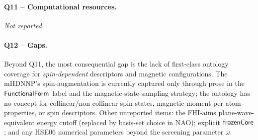\paragraph{Q11 -- Computational resources.}
\emph{Not reported.}


\paragraph{Q12 -- Gaps.}
Beyond Q11, the most consequential gap is the lack of first-class
ontology coverage for \emph{spin-dependent} descriptors and magnetic
configurations. The mHDNNP's spin-augmentation is currently captured
only through prose in the $\mathsf{FunctionalForm}$ label and the
magnetic-state-sampling strategy; the ontology has no concept for
collinear/non-collinear spin states, magnetic-moment-per-atom
properties, or spin descriptors. Other unreported items: the FHI-aims
plane-wave-equivalent energy cutoff (replaced by basis-set choice in
NAO); explicit $\mathsf{frozenCore}$; and any HSE06 numerical
parameters beyond the screening parameter $\omega$.
